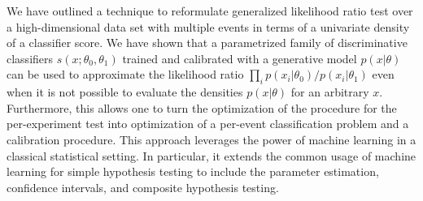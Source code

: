 \documentclass[aoas,preprint]{imsart}
\numberwithin{equation}{section}
\theoremstyle{plain}
\begin{document}
We have outlined a technique to reformulate generalized likelihood ratio test over a high-dimensional data set with multiple events in terms of a univariate density of a classifier score. 
We have shown that a parametrized family of discriminative classifiers $s(x; \theta_0, \theta_1)$ trained and calibrated with a generative model $p(x|\theta)$ can be used to approximate the  likelihood ratio  $\prod_i p(x_i|\theta_0)/p(x_i|\theta_1)$ even when it is not possible to evaluate the densities $p(x|\theta)$ for an arbitrary $x$.  Furthermore, this allows one to turn the optimization of the procedure for the per-experiment test into optimization of a per-event classification problem and a calibration procedure. This approach leverages the power of machine learning in a classical statistical setting. In particular, it extends the common usage of machine learning for simple hypothesis testing to include the parameter estimation, confidence intervals, and composite hypothesis testing.

\end{document}
